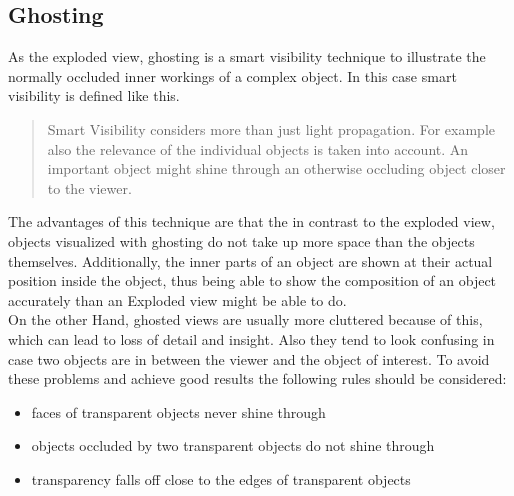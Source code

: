 \subsection{Ghosting}
As the exploded view, ghosting is a smart visibility technique to illustrate the normally occluded inner workings of a complex object. In this case smart visibility is defined like this.
\begin{quote}Smart Visibility considers more than just light propagation. For example also the relevance of the individual objects is taken into account. An important object might shine through an otherwise occluding object closer to the viewer. \cite{Viola-05-Smart}\end{quote}
The advantages of this technique are that the in contrast to the exploded view, objects visualized with ghosting do not take up more space than the objects themselves. Additionally, the inner parts of an object are shown at their actual position inside the object, thus being able to show the composition of an object accurately than an Exploded view might be able to do.\\
On the other Hand, ghosted views are usually more cluttered because of this, which can lead to loss of detail and insight. Also they tend to look confusing in case two objects are in between the viewer and the object of interest. To avoid these problems and achieve good results the following rules should be considered:\cite{Viola-05-Smart}
\begin{itemize}
\item faces of transparent objects never shine through
\item objects occluded by two transparent objects do not shine through
\item transparency falls off close to the edges of transparent objects
\end{itemize}
